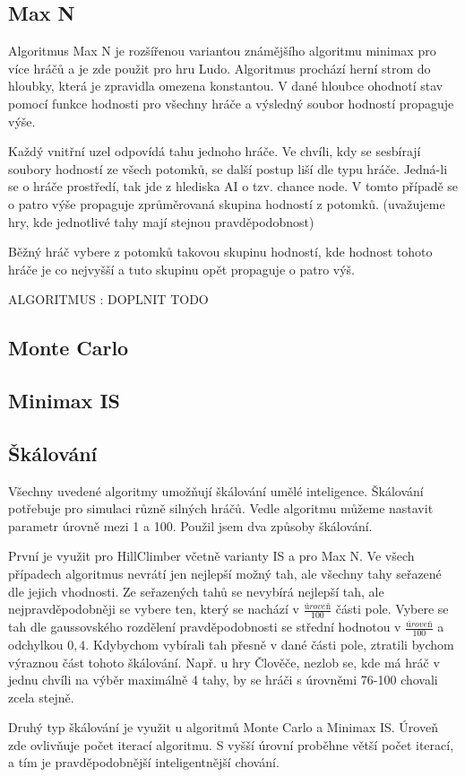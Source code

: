 \subsection{Max N}

Algoritmus Max N je rozšířenou variantou známějšího algoritmu minimax pro více hráčů a je zde použit pro hru Ludo. Algoritmus prochází herní strom do hloubky, která je zpravidla omezena konstantou. V dané hloubce ohodnotí stav pomocí funkce hodnosti pro všechny hráče a výsledný soubor hodností propaguje výše. 

Každý vnitřní uzel odpovídá tahu jednoho hráče. Ve chvíli, kdy se sesbírají soubory hodností ze všech potomků, se další postup liší dle typu hráče. Jedná-li se o hráče prostředí, tak jde z hlediska AI o tzv. chance node. V tomto případě se o patro výše propaguje zprůměrovaná skupina hodností z potomků. (uvažujeme hry, kde jednotlivé tahy mají stejnou pravděpodobnost)

Běžný hráč vybere z potomků takovou skupinu hodností, kde hodnost tohoto hráče je co nejvyšší a tuto skupinu opět propaguje o patro výš.

ALGORITMUS : DOPLNIT TODO

\subsection{Monte Carlo}

\subsection{Minimax IS}

\subsection{Škálování}

Všechny uvedené algoritmy umožňují škálování umělé inteligence. Škálování potřebuje pro simulaci různě silných hráčů. Vedle algoritmu můžeme nastavit parametr úrovně mezi 1 a 100. Použil jsem dva způsoby škálování. 

První je využit pro HillClimber včetně varianty IS a pro Max N. Ve všech případech algoritmus nevrátí jen nejlepší možný tah, ale všechny tahy seřazené dle jejich vhodnosti. Ze seřazených tahů se nevybírá nejlepší tah, ale nejpravděpodobněji se vybere ten, který se nachází v $\frac{úroveň}{100}$ části pole. Vybere se tah dle gaussovského rozdělení pravděpodobnosti se střední hodnotou v $\frac{úroveň}{100}$ a odchylkou $0,4$. Kdybychom vybírali tah přesně v dané části pole, ztratili bychom výraznou část tohoto škálování. Např. u hry Člověče, nezlob se, kde má hráč v jednu chvíli na výběr maximálně 4 tahy, by se hráči s úrovněmi 76-100 chovali zcela stejně.

Druhý typ škálování je využit u algoritmů Monte Carlo a Minimax IS. Úroveň zde ovlivňuje počet iterací algoritmu. S vyšší úrovní proběhne větší počet iterací, a tím je pravděpodobnější inteligentnější chování.

\endinput
